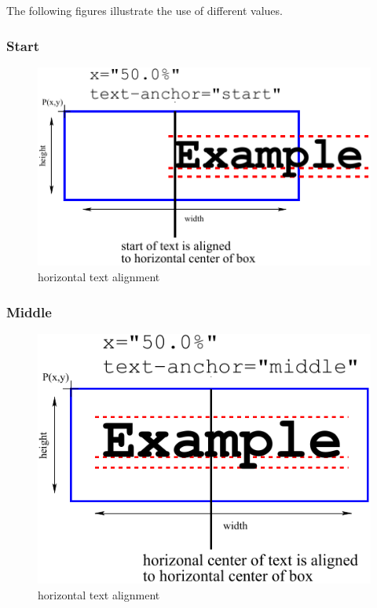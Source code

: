 The following figures illustrate the use of different \HTextAnchor values.

\subsubsection{Start}

\begin{figure}[h!]
\begin{center}
\includegraphics[scale=0.60]{figures/HorizontalTextPlacement_Start}
\end{center}
\caption{horizontal text alignment }
\label{HorizontalTextPlacement_Start}
\end{figure}

\subsubsection{Middle}

\begin{figure}[h!]
\begin{center}
\includegraphics[scale=0.60]{figures/HorizontalTextPlacement_Middle}
\end{center}
\caption{horizontal text alignment }
\label{HorizontalTextPlacement_Middle}
\end{figure}

